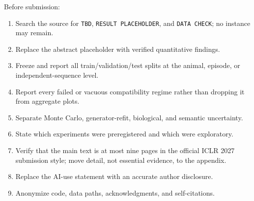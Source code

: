 \documentclass{article}
\theoremstyle{remark}
\begin{document}
Before submission:
\begin{enumerate}[leftmargin=1.5em]
  \item Search the source for \texttt{TBD}, \texttt{RESULT PLACEHOLDER}, and
  \texttt{DATA CHECK}; no instance may remain.
  \item Replace the abstract placeholder with verified quantitative findings.
  \item Freeze and report all train/validation/test splits at the animal,
  episode, or independent-sequence level.
  \item Report every failed or vacuous compatibility regime rather than
  dropping it from aggregate plots.
  \item Separate Monte Carlo, generator-refit, biological, and semantic
  uncertainty.
  \item State which experiments were preregistered and which were exploratory.
  \item Verify that the main text is at most nine pages in the official ICLR
  2027 submission style; move detail, not essential evidence, to the appendix.
  \item Replace the AI-use statement with an accurate author disclosure.
  \item Anonymize code, data paths, acknowledgments, and self-citations.
\end{enumerate}
\end{document}
